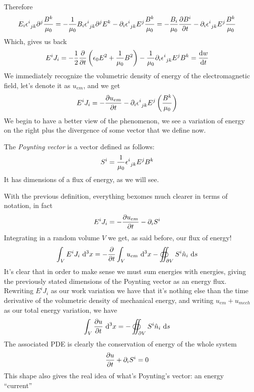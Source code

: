 \documentclass[../electromagnetism]{subfiles}
\begin{document}
Therefore
\begin{equation*}
	E_i\epsilon^{i}_{\ jk}\partial^j\frac{B^k}{\mu_0}=-\frac{1}{\mu_0}B_i\epsilon^{i}_{\ jk}\partial^jE^k-\partial_i\epsilon^{i}_{\ jk}E^j\frac{B^k}{\mu_0}=-\frac{B_i}{\mu_0}\pdv{B^i}{t}-\partial_i\epsilon^{i}_{\ jk}E^j\frac{B^k}{\mu_0}
\end{equation*}
Which, gives us back
\begin{equation}
	E^iJ_i=-\frac{1}{2}\pdv{t}\left( \epsilon_0E^2+\frac{1}{\mu_0}B^2 \right)-\frac{1}{\mu_0}\partial_i\epsilon^{i}_{\ jk}E^jB^k=\dv{w}{t}
	\label{eq:diffworkpoynting}
\end{equation}
We immediately recognize the volumetric density of energy of the electromagnetic field, let's denote it as $u_{em}$, and we get
\begin{equation}
	E^iJ_i=-\pdv{u_{em}}{t}-\partial_i\epsilon^{i}_{\ jk}E^j\left( \frac{B^k}{\mu_0} \right)
	\label{eq:poynting-1}
\end{equation}
We begin to have a better view of the phenomenon, we see a variation of energy on the right plus the divergence of some vector that we define now.
\begin{dfn}
	The \textit{Poynting vector} is a vector defined as follows:
	\begin{equation}
		S^i=\frac{1}{\mu_0}\epsilon^{i}_{\ jk}E^jB^k
		\label{eq:poyntingdef}
	\end{equation}
	It has dimensions of a flux of energy, as we will see.
\end{dfn}
With the previous definition, everything bexomes much clearer in terms of notation, in fact
\begin{equation*}
	E^iJ_i=-\pdv{u_{em}}{t}-\partial_iS^i
\end{equation*}
Integrating in a random volume $V$ we get, as said before, our flux of energy!
\begin{equation*}
	\int_VE^iJ_i\ \mathrm{d}^3x=-\pdv{t}\int_Vu_{em}\ \mathrm{d}^3x - \oiint_{\partial V}S^i\hat{n}_i\ \mathrm{d} s
\end{equation*}
It's clear that in order to make sense we must sum energies with energies, giving the previously stated dimensions of the Poynting vector as an energy flux.\\
Rewriting $E^iJ_i$ as our work variation we have that it's nothing else than the time derivative of the volumetric density of mechanical energy, and writing $u_{em}+u_{mech}$ as our total energy variation, we have
\begin{equation}
	\int_{V}^{}\pdv{u}{t}\ \mathrm{d}^3{x}=-\oiint_{\partial V}S^i\hat{n}_i\ \mathrm{d} s
	\label{eq:energyvariationpoynting}
\end{equation}
The associated PDE is clearly the conservation of energy of the whole system
\begin{equation}
	\pdv{u}{t}+\partial_iS^i=0
	\label{eq:energyconspoynting}
\end{equation}
This shape also gives the real idea of what's Poynting's vector: an energy ``current''
\end{document}
